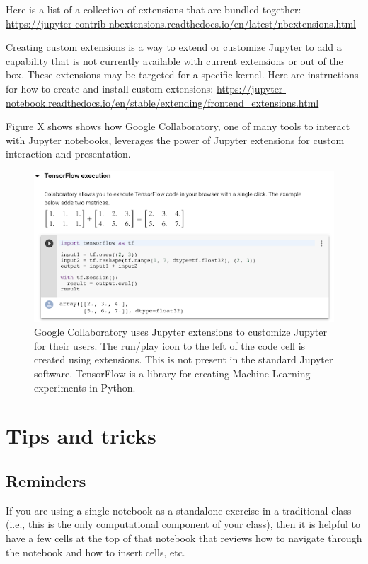 \documentclass[]{book}
\begin{document}
Here is a list of a collection of extensions that are bundled together:
\url{https://jupyter-contrib-nbextensions.readthedocs.io/en/latest/nbextensions.html}

Creating custom extensions is a way to extend or customize Jupyter to
add a capability that is not currently available with current extensions
or out of the box. These extensions may be targeted for a specific
kernel. Here are instructions for how to create and install custom
extensions:
\url{https://jupyter-notebook.readthedocs.io/en/stable/extending/frontend_extensions.html}

Figure X shows shows how Google Collaboratory, one of many tools to
interact with Jupyter notebooks, leverages the power of Jupyter
extensions for custom interaction and presentation.

\begin{figure}
\centering
\includegraphics{images/chapter53.png}
\caption{Google Collaboratory uses Jupyter extensions to customize
Jupyter for their users. The run/play icon to the left of the code cell
is created using extensions. This is not present in the standard Jupyter
software. TensorFlow is a library for creating Machine Learning
experiments in Python.}
\end{figure}

\section{Tips and tricks}\label{tips-and-tricks}

\subsection{Reminders}\label{reminders}

If you are using a single notebook as a standalone exercise in a
traditional class (i.e., this is the only computational component of
your class), then it is helpful to have a few cells at the top of that
notebook that reviews how to navigate through the notebook and how to
insert cells, etc.
\end{document}
